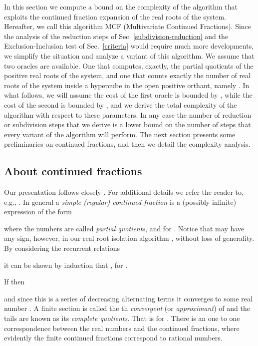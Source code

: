 \documentclass{sig-alternate}
\begin{document}
In this section we compute a bound on the complexity of the algorithm
that exploits the continued fraction expansion of the real roots of
the system.  Hereafter, we call this algorithm MCF (Multivariate
Continued Fractions).  Since the analysis of the reduction steps of
Sec. \ref{subdivision-reduction} and the Exclusion-Inclusion test of
Sec.~\ref{criteria} would require much more developments, we simplify
the situation and analyze a variant of this algorithm. We assume that
two oracles are available. One that computes, exactly, the partial
quotients of the positive real roots of the system, and one that
counts exactly the number of real roots of the system inside a
hypercube in the open positive orthant, namely  . In what
follows, we will assume the cost of the first oracle is bounded by
, while the cost of the second is bounded by
, and we derive the total complexity of the algorithm
with respect to these parameters.  In any case the number of reduction
or subdivision steps that we derive is a lower bound on the number of
steps that every variant of the algorithm will perform. The next
section presents some preliminaries on continued fractions, and then
we detail the complexity analysis.


\subsection{About continued fractions}

Our presentation follows closely \cite{emt-lncs-2006}.
For additional details we refer the reader to, e.g., \cite{Yap2000,BomPoo:contfrac:95,Poorten:intro}.
In general a {\em simple (regular) continued fraction} 
is a (possibly infinite)  expression of the form 

where the numbers  are called {\em partial quotients}, 
 and  for .  
Notice that  may have any sign, however, in our real root isolation
algorithm , without loss of generality.
By considering the recurrent relations

it can be shown by induction that ,
for .


If  then 
 
and since this is a series of decreasing alternating terms it converges to some real
number .
A finite section 
is called the th {\em convergent} (or {\em approximant}) of 
and the tails   are known as its
{\em complete quotients}. 
That is  
for .
There is an one to one correspondence between the real numbers and the continued
fractions, where evidently the finite continued fractions correspond
to rational numbers.
\end{document}
